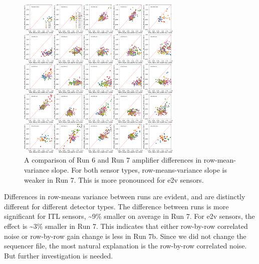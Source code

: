 \begin{figure}[H]
\begin{centering}
\includegraphics[width=0.7\textwidth]{figures/baselineCharacterization/13550_E1071_ROW_MEAN_VAR_SLOPE.png}
\caption{A comparison of Run 6 and Run 7 amplifier differences in row-mean-variance slope. For both sensor types, row-means-variance slope is weaker in Run 7. This is more pronounced for e2v sensors.}
\end{centering}
\end{figure}

Differences in row-means variance between runs are evident, and are distinctly different for different detector types. The difference between runs is more significant for ITL sensors, \textasciitilde9\% smaller on average in Run 7. For e2v sensors, the effect is \textasciitilde3\% smaller in Run 7. This indicates that either row-by-row correlated noise or row-by-row gain change is less in Run 7b. Since we did not change the sequencer file, the most natural explanation is the row-by-row correlated noise. But further investigation is needed.

